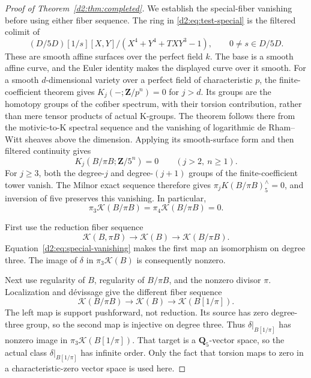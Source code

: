 \documentclass[11pt,a4paper]{amsart}
\numberwithin{equation}{section}
\theoremstyle{definition}
\theoremstyle{remark}
\newcommand{\DtwoZZ}{\mathbf{Z}}
\newcommand{\DtwoQQ}{\mathbf{Q}}
\newcommand{\DtwocK}{\mathcal K}
\begin{document}
\begin{proof}[Proof of Theorem~\ref{d2:thm:completed}]
We establish the special-fiber vanishing before using either fiber
sequence.
The ring in \eqref{d2:eq:test-special} is the filtered colimit of
\[
 (D/5D)[1/s][X,Y]/(X^4+Y^4+TXY^3-1),
 \qquad 0\ne s\in D/5D.
\]
These are smooth affine surfaces over the perfect field \(k\).
The base is a smooth affine curve, and the Euler identity makes
the displayed curve over it smooth.
For a smooth \(d\)-dimensional variety over a perfect field of
characteristic \(p\), the finite-coefficient theorem
\cite[Theorem~8.4]{GeisserLevineCharP} gives
\(K_j(-;\DtwoZZ/p^n)=0\) for \(j>d\).
Its groups are the homotopy groups of the cofiber spectrum, with
their torsion contribution, rather than mere tensor products of
actual K-groups.
The theorem follows there from the motivic-to-K spectral sequence
and the vanishing of logarithmic de Rham--Witt sheaves above the
dimension.
Applying its smooth-surface form and then filtered continuity gives
\[
 K_j(B/\pi B;\DtwoZZ/5^n)=0
 \qquad(j>2,\ n\ge1).
\]
For \(j\ge3\), both the degree-\(j\) and degree-\((j+1)\) groups
of the finite-coefficient tower vanish.
The Milnor exact sequence therefore gives
\(\pi_jK(B/\pi B)^\wedge_5=0\), and inversion of five preserves
this vanishing. In particular,
\begin{equation}\label{d2:eq:special-vanishing}
 \pi_3\DtwocK(B/\pi B)=\pi_4\DtwocK(B/\pi B)=0.
\end{equation}

First use the reduction fiber sequence
\begin{equation}\label{d2:eq:reduction-fiber}
 \DtwocK(B,\pi B)\longrightarrow\DtwocK(B)
                  \longrightarrow\DtwocK(B/\pi B).
\end{equation}
Equation~\eqref{d2:eq:special-vanishing} makes the first map an
isomorphism on degree three.
The image of \(\delta\) in \(\pi_3\DtwocK(B)\) is consequently nonzero.

Next use regularity of \(B\), regularity of \(B/\pi B\), and
the nonzero divisor \(\pi\).
Localization and d\'evissage
\cite[V.4.1, V.6.1]{Weibel} give the different fiber sequence
\begin{equation}\label{d2:eq:localization-fiber}
 \DtwocK(B/\pi B)\longrightarrow\DtwocK(B)
                         \longrightarrow\DtwocK(B[1/\pi]).
\end{equation}
The left map is support pushforward, not reduction.
Its source has zero degree-three group, so the second map is
injective on degree three.
Thus \(\delta|_{B[1/\pi]}\) has nonzero image in
\(\pi_3\DtwocK(B[1/\pi])\).
That target is a \(\DtwoQQ_5\)-vector space, so the actual class
\(\delta|_{B[1/\pi]}\) has infinite order.
Only the fact that torsion maps to zero in a characteristic-zero
vector space is used here.


\end{proof}
\end{document}
